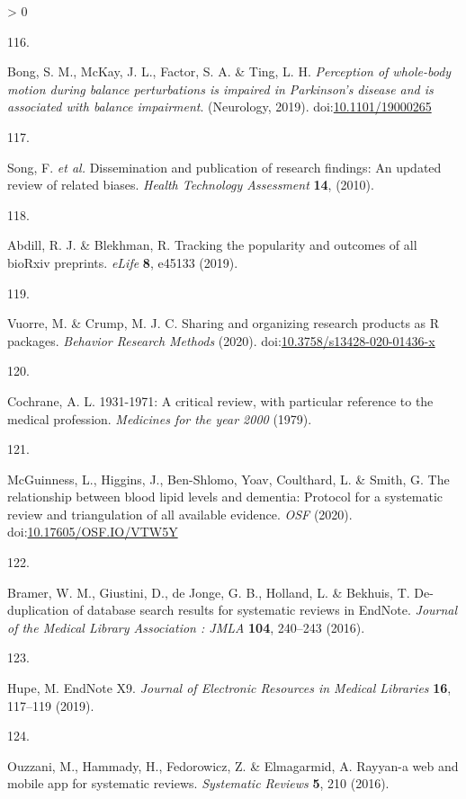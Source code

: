 \documentclass[a4paper, twoside]{templates/ociamthesis}
\newlength{\cslhangindent}
\newlength{\csllabelwidth}
\newenvironment{CSLReferences}[3] %
 {%
  \setlength{\parindent}{0pt}
  \ifodd #1 \everypar{\setlength{\hangindent}{\cslhangindent}}\ignorespaces\fi
  \ifnum #2 > 0
  \setlength{\parskip}{#2\baselineskip}
  \fi
 }%
 {}
\newcommand{\CSLLeftMargin}[1]{\parbox[t]{\maxof{\widthof{#1}}{\csllabelwidth}}{#1}}
\newcommand{\CSLRightInline}[1]{\parbox[t]{\linewidth - \csllabelwidth}{#1}}
\begin{document}
\begin{CSLReferences}{0}{0}
\leavevmode\hypertarget{ref-bong2019}{}%
\CSLLeftMargin{116. }
\CSLRightInline{Bong, S. M., McKay, J. L., Factor, S. A. \& Ting, L. H. \emph{Perception of whole-body motion during balance perturbations is impaired in {Parkinson}'s disease and is associated with balance impairment}. ({Neurology}, 2019). doi:\href{https://doi.org/10.1101/19000265}{10.1101/19000265}}

\leavevmode\hypertarget{ref-song2010}{}%
\CSLLeftMargin{117. }
\CSLRightInline{Song, F. \emph{et al.} Dissemination and publication of research findings: An updated review of related biases. \emph{Health Technology Assessment} \textbf{14}, (2010).}

\leavevmode\hypertarget{ref-abdill2019b}{}%
\CSLLeftMargin{118. }
\CSLRightInline{Abdill, R. J. \& Blekhman, R. Tracking the popularity and outcomes of all {bioRxiv} preprints. \emph{eLife} \textbf{8}, e45133 (2019).}

\leavevmode\hypertarget{ref-vuorre2020}{}%
\CSLLeftMargin{119. }
\CSLRightInline{Vuorre, M. \& Crump, M. J. C. Sharing and organizing research products as {R} packages. \emph{Behavior Research Methods} (2020). doi:\href{https://doi.org/10.3758/s13428-020-01436-x}{10.3758/s13428-020-01436-x}}

\leavevmode\hypertarget{ref-cochrane1979}{}%
\CSLLeftMargin{120. }
\CSLRightInline{Cochrane, A. L. 1931-1971: A critical review, with particular reference to the medical profession. \emph{Medicines for the year 2000} (1979).}

\leavevmode\hypertarget{ref-mcguinnessluke2020}{}%
\CSLLeftMargin{121. }
\CSLRightInline{McGuinness, L., Higgins, J., Ben-Shlomo, Yoav, Coulthard, L. \& Smith, G. The relationship between blood lipid levels and dementia: Protocol for a systematic review and triangulation of all available evidence. \emph{OSF} (2020). doi:\href{https://doi.org/10.17605/OSF.IO/VTW5Y}{10.17605/OSF.IO/VTW5Y}}

\leavevmode\hypertarget{ref-bramer2016}{}%
\CSLLeftMargin{122. }
\CSLRightInline{Bramer, W. M., Giustini, D., de Jonge, G. B., Holland, L. \& Bekhuis, T. De-duplication of database search results for systematic reviews in {EndNote}. \emph{Journal of the Medical Library Association : JMLA} \textbf{104}, 240--243 (2016).}

\leavevmode\hypertarget{ref-hupe2019}{}%
\CSLLeftMargin{123. }
\CSLRightInline{Hupe, M. {EndNote X9}. \emph{Journal of Electronic Resources in Medical Libraries} \textbf{16}, 117--119 (2019).}

\leavevmode\hypertarget{ref-ouzzani2016}{}%
\CSLLeftMargin{124. }
\CSLRightInline{Ouzzani, M., Hammady, H., Fedorowicz, Z. \& Elmagarmid, A. Rayyan-a web and mobile app for systematic reviews. \emph{Systematic Reviews} \textbf{5}, 210 (2016).}


\end{CSLReferences}
\end{document}
